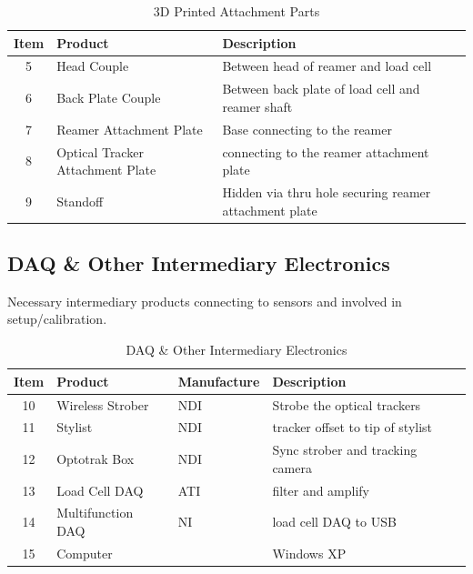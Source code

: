 \documentclass[pdftex,11pt,letterpaper]{article}
\begin{document}
\begin{table}[h!]
\begin{center}
    \begin{tabular}{ | c | l | l |}
    \hline
    Item & Product & Description \\ \hline
    5 & Head Couple & Between head of reamer and load cell \\ \hline  
    6 & Back Plate Couple & Between back plate of load cell and reamer shaft \\ \hline
    7 & Reamer Attachment Plate & Base connecting to the reamer \\ \hline
    8 & Optical Tracker Attachment Plate & connecting to the reamer attachment plate \\ \hline
    9 & Standoff & Hidden via thru hole securing reamer attachment plate \\ \hline  
    \end{tabular}
    \caption{3D Printed Attachment Parts}
\end{center}
\end{table}

\pagebreak
\subsection{DAQ \& Other Intermediary Electronics}
Necessary intermediary products connecting to sensors and involved in setup/calibration. 
\begin{table}[h!]
\begin{center}
    \begin{tabular}{ | c | l | l | l |}
    \hline
    Item & Product & Manufacture & Description \\ \hline
    10 & Wireless Strober & NDI & Strobe the optical trackers \\ \hline
    11 & Stylist & NDI & tracker offset to tip of stylist \\ \hline
    12 & Optotrak Box & NDI & Sync strober and tracking camera \\ \hline
    13 & Load Cell DAQ & ATI & filter and amplify \\ \hline
    14 & Multifunction DAQ & NI & load cell DAQ to USB  \\ \hline
    15 & Computer & & Windows XP \\ \hline
	\end{tabular}
	\caption{DAQ \& Other Intermediary Electronics}
\end{center}
\end{table}
\end{document}
